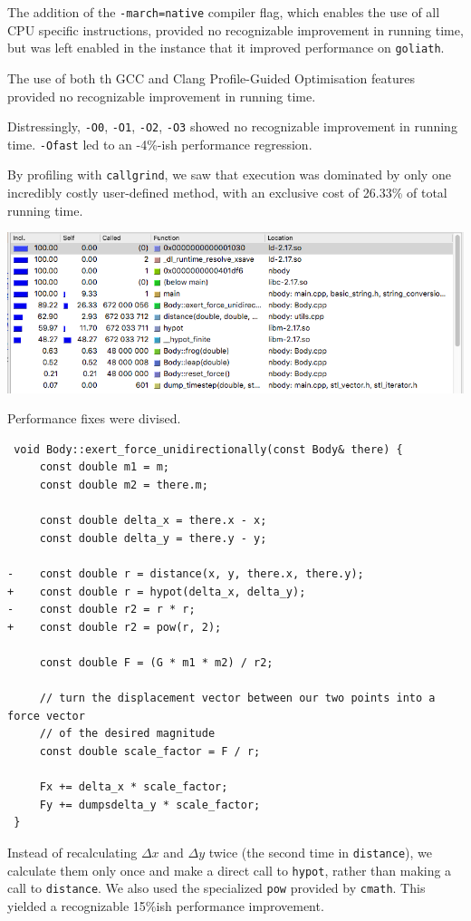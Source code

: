 \documentclass[11pt,a4paper]{article}
\begin{document}
The addition of the 
\texttt{-march=native} compiler flag, which enables the use of all CPU specific instructions, provided no recognizable improvement in running time, but was left enabled in the instance that it improved performance on \texttt{goliath}.

The use of both th GCC and Clang Profile-Guided Optimisation features provided no recognizable improvement in running time.

Distressingly, \texttt{-O0}, \texttt{-O1}, \texttt{-O2}, \texttt{-O3} showed no recognizable improvement in running time. \texttt{-Ofast} led to an -4\%-ish performance regression.

By profiling with \texttt{callgrind}, we saw that execution was dominated by only one incredibly costly user-defined method, with an exclusive cost of 26.33\% of total running time.

\includegraphics[width=\textwidth]{profile}

Performance fixes were divised.

\begin{verbatim}
 void Body::exert_force_unidirectionally(const Body& there) {
     const double m1 = m;
     const double m2 = there.m;

     const double delta_x = there.x - x;
     const double delta_y = there.y - y;
     
-    const double r = distance(x, y, there.x, there.y);
+    const double r = hypot(delta_x, delta_y);
-    const double r2 = r * r;
+    const double r2 = pow(r, 2);

     const double F = (G * m1 * m2) / r2;

     // turn the displacement vector between our two points into a force vector
     // of the desired magnitude
     const double scale_factor = F / r;

     Fx += delta_x * scale_factor;
     Fy += dumpsdelta_y * scale_factor;
 }
\end{verbatim}

Instead of recalculating $\Delta x$ and $\Delta y$ twice (the second time in \texttt{distance}), we calculate them only once and make a direct call to \texttt{hypot}, rather than making a call to \texttt{distance}. We also used the specialized \texttt{pow} provided by \texttt{cmath}. This yielded a recognizable 15\%ish performance improvement. 
\end{document}
